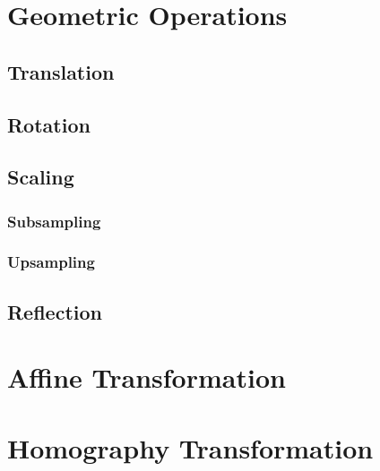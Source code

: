 \section{Geometric Operations}
\subsection{Translation}
\subsection{Rotation}
\subsection{Scaling}
\subsubsection{Subsampling}
\subsubsection{Upsampling}
\subsection{Reflection}
\section{Affine Transformation}
\section{Homography Transformation}
